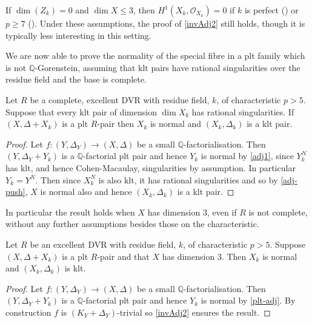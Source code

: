 \begin{remark}
	If $\dim(Z_k)=0$ and $\dim X \leq 3$, then $H^1(X_k, \mathcal{O}_{X_k})=0$ if $k$ is perfect (\cite[Proposition 2.20]{NT20}) or $p \geq 7$ (\cite[Theorem 5.7]{BT22}). Under these assumptions, the proof of \autoref{invAdj2} still holds, though it is typically less interesting in this setting.
\end{remark}

We are now able to prove the normality of the special fibre in a plt family which is not $\mathbb{Q}$-Gorenstein, assuming that klt pairs have rational singularities over the residue field and the base is complete.

\begin{theorem}\label{NormalToRational}
	Let $R$ be a complete, excellent DVR with residue field, $k$, of characteristic $p> 5$. Suppose that every klt pair of dimension $\dim X_{k}$ has rational singularities. If $(X,\Delta+X_{k})$ is a plt $R$-pair then $X_{k}$ is normal and $(X_{k}, \Delta_{k})$ is a klt pair.
\end{theorem}

\begin{proof}
	
	Let $f\colon (Y,\Delta_{Y})\to (X,\Delta)$ be a small $\mathbb{Q}$-factorialisation. Then $(Y,\Delta_{Y}+Y_{k})$ is a $\mathbb{Q}$-factorial plt pair and hence $Y_{k}$ is normal by \autoref{adj1}, since $Y_{k}^{N}$ has klt, and hence Cohen-Macaulay, singularities by assumption. In particular $Y_{k}=Y^{N}$. Then since $X_{k}^{N}$ is also klt, it has rational singularities and so by \autoref{adj-push}, $X$ is normal also and hence $(X_{k},\Delta_{k})$ is a klt pair.
	
\end{proof}

In particular the result holds when $X$ has dimension $3$, even if $R$ is not complete, without any further assumptions besides those on the characteristic.
 
\begin{corollary}\label{invAdj3}
	Let $R$ be an excellent DVR with residue field, $k$, of characteristic $p> 5$. Suppose $(X,\Delta+X_{k})$ is a plt $R$-pair and that $X$ has dimension $3$. Then $X_{k}$ is normal and $(X_{k}, \Delta_{k})$ is klt.
\end{corollary}

\begin{proof}
	Let $f\colon (Y,\Delta_{Y})\to (X,\Delta)$ be a small $\mathbb{Q}$-factorialisation. Then $(Y,\Delta_{Y}+Y_{k})$ is a $\mathbb{Q}$-factorial plt pair and hence $Y_{k}$ is normal by \autoref{plt-adj}. 
	By construction $f$ is $(K_{Y}+\Delta_{Y})$-trivial so \autoref{invAdj2} ensures the result.
\end{proof}

